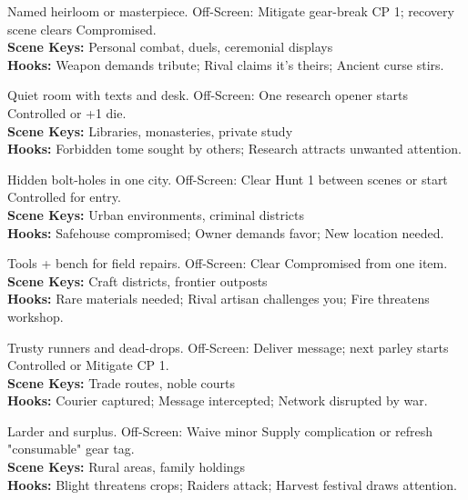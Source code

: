\documentclass[12pt]{article}
\begin{document}
\begin{description}[leftmargin=*]
  \item[\textbf{Signature Weapon}] Named heirloom or masterpiece. Off-Screen: Mitigate gear-break CP 1; recovery scene clears Compromised. \\
  \textbf{Scene Keys:} Personal combat, duels, ceremonial displays \\
  \textbf{Hooks:} Weapon demands tribute; Rival claims it's theirs; Ancient curse stirs.

  \item[\textbf{Scholar's Cell}] Quiet room with texts and desk. Off-Screen: One research opener starts Controlled or +1 die. \\
  \textbf{Scene Keys:} Libraries, monasteries, private study \\
  \textbf{Hooks:} Forbidden tome sought by others; Research attracts unwanted attention.

  \item[\textbf{Safehouse Network}] Hidden bolt-holes in one city. Off-Screen: Clear Hunt 1 between scenes or start Controlled for entry. \\
  \textbf{Scene Keys:} Urban environments, criminal districts \\
  \textbf{Hooks:} Safehouse compromised; Owner demands favor; New location needed.

  \item[\textbf{Artisan's Workshop}] Tools + bench for field repairs. Off-Screen: Clear Compromised from one item. \\
  \textbf{Scene Keys:} Craft districts, frontier outposts \\
  \textbf{Hooks:} Rare materials needed; Rival artisan challenges you; Fire threatens workshop.

  \item[\textbf{Courier Network}] Trusty runners and dead-drops. Off-Screen: Deliver message; next parley starts Controlled or Mitigate CP 1. \\
  \textbf{Scene Keys:} Trade routes, noble courts \\
  \textbf{Hooks:} Courier captured; Message intercepted; Network disrupted by war.

  \item[\textbf{Small Farm/Orchard}] Larder and surplus. Off-Screen: Waive minor Supply complication or refresh "consumable" gear tag. \\
  \textbf{Scene Keys:} Rural areas, family holdings \\
  \textbf{Hooks:} Blight threatens crops; Raiders attack; Harvest festival draws attention.


\end{description}
\end{document}
